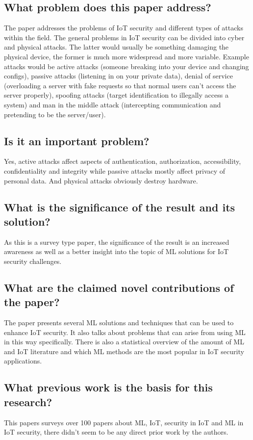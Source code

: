 \documentclass[11pt,a4paper]{article}
\begin{document}
\subsection*{What problem does this paper address?}
The paper addresses the problems of IoT security and different types of attacks within the field. The general problems in IoT security can be divided into cyber and physical attacks. The latter would usually be something damaging the physical device, the former is much more widespread and more variable. Example attacks would be active attacks (someone breaking into your device and changing configs), passive attacks (listening in on your private data), denial of service (overloading a server with fake requests so that normal users can’t access the server properly), spoofing attacks (target identification to illegally access a system) and man in the middle attack (intercepting communication and pretending to be the server/user).

\subsection*{Is it an important problem?}
Yes, active attacks affect aspects of authentication, authorization, accessibility, confidentiality and integrity while passive attacks mostly affect privacy of personal data. And physical attacks obviously destroy hardware. 

\subsection*{What is the significance of the result and its solution?}
As this is a survey type paper, the significance of the result is an increased awareness as well as a better insight into the topic of ML solutions for IoT security challenges.

\subsection*{What are the claimed novel contributions of the paper?}
The paper presents several ML solutions and techniques that can be used to enhance IoT security. It also talks about problems that can arise from using ML in this way specifically. There is also a statistical overview of the amount of ML and IoT literature and which ML methods are the most popular in IoT security applications.

\subsection*{What previous work is the basis for this research?}
This papers surveys over 100 papers about ML, IoT, security in IoT and ML in IoT security, there didn’t seem to be any direct prior work by the authors.
\end{document}
